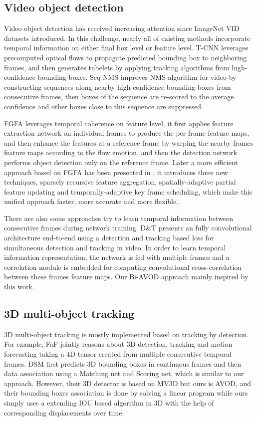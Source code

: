 \documentclass{bmvc2k}
\begin{document}
\subsection{Video object detection}
Video object detection has received increasing attention since ImageNet VID datasets introduced. In this challenge, nearly all of existing methods incorporate temporal information on either final box level or feature level. T-CNN \cite{kang2018t, kang2016object} leverages precomputed optical flows to propagate predicted bounding box to neighboring frames, and then generates tubelets by applying tracking algorithms from high-confidence bounding boxes. Seq-NMS \cite{han2016seq} improves NMS algorithm for video by constructing sequences along nearby high-confidence bounding boxes from consecutive frames, then boxes of the sequence are re-scored to the average confidence and other boxes close to this sequence are suppressed. 

FGFA \cite{zhu2017flow} leverages temporal coherence on feature level, it first applies feature extraction network on individual frames to produce the per-frame feature maps, and then enhance the features at a reference frame by warping the nearby frames feature maps according to the flow emotion, and then the detection network performs object detection only on the reference frame. Later a more efficient approach based on FGFA has been presented in \cite{zhu2018towards}, it introduces three new techniques, sparsely recursive feature aggregation, spatially-adaptive partial feature updating and temporally-adaptive key frame scheduling, which make this unified approach faster, more accurate and more flexible.

There are also some approaches try to learn temporal information between consecutive frames during network training. D\&T \cite{feichtenhofer2017detect} presents an fully convolutional architecture end-to-end using a detection and tracking based loss for simultaneous detection and tracking in video. In order to learn temporal information representation, the network is fed with multiple frames and a correlation module is embedded for computing convolutional cross-correlation between these frames feature maps. Our Bi-AVOD approach mainly inspired by this work. 

\subsection{3D multi-object tracking}
3D multi-object tracking is mostly implemented based on tracking by detection. For example, FaF \cite{luo2018fast} jointly reasons about 3D detection, tracking and motion forecasting taking a 4D tensor created from multiple consecutive temporal frames. DSM \cite{frossard2018end} first predicts 3D bounding boxes in continuous frames and then data association using a Matching net and Scoring net, which is similar to our approach. However, their 3D detector is based on MV3D but ours is AVOD, and their bounding boxes association is done by solving a linear program while ours simply uses a extending IOU based algorithm \cite{bochinski2018extending} in 3D with the help of corresponding displacements over time.
\end{document}
